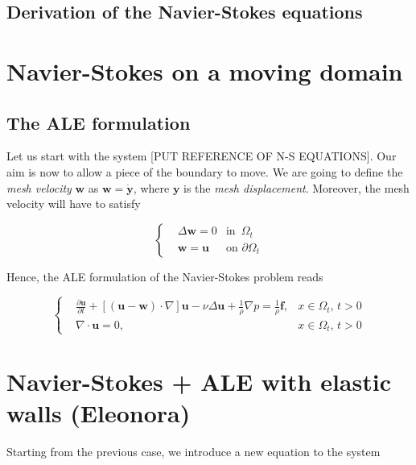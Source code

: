\documentclass[11pt,a4paper,titlepage]{report}
\begin{document}

\subsection{Derivation of the Navier-Stokes equations}


\section{Navier-Stokes on a moving domain}


\subsection{The ALE formulation}
Let us start with the system [PUT REFERENCE OF N-S EQUATIONS]. Our aim is now to allow a piece of the boundary to move. We are going to define the \textit{mesh velocity} $\mathbf{w}$ as $\mathbf{w} = \dot{\mathbf{y}}$, where $\mathbf{y}$ is the \textit{mesh displacement}. Moreover, the mesh velocity will have to satisfy 

\[
\left\{  
\begin{aligned}
& \Delta \mathbf{w} = 0 	& \text{in } \, \Omega_t \\
& \mathbf{w} = \mathbf{u} 				& \text{on } \partial \Omega_t
\end{aligned}
\right.
\]

Hence, the ALE formulation of the Navier-Stokes problem reads

\[
\left\{  
\begin{aligned}
&\frac{\partial \mathbf{u}}{\partial t} + [(\mathbf{u - w}) \cdot \nabla] \mathbf{u} - \nu \Delta \mathbf{u} + \frac{1}{\rho} \nabla p = \frac{1}{\rho} \mathbf{f},  & x \in \Omega_t, \, t>0 \\
& \nabla \cdot \mathbf{u} = 0, & x \in \Omega_t, \, t>0
\end{aligned}
\right.
\]

\section{Navier-Stokes + ALE with elastic walls (Eleonora)}

Starting from the previous case, we introduce a new equation to the system 
\end{document}
